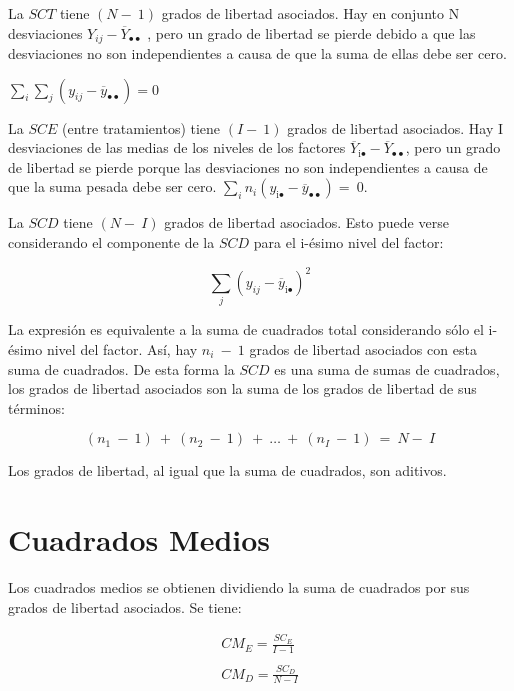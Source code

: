 \documentclass[]{book}
\theoremstyle{definition}
\theoremstyle{definition}
\theoremstyle{definition}
\theoremstyle{remark}
\begin{document}
La \(SCT\) tiene \((N -\ 1)\) grados de libertad asociados. Hay en
conjunto N desviaciones \(Y_{ij} - {\overline{Y}}_{\bullet\bullet}\) ,
pero un grado de libertad se pierde debido a que las desviaciones no son
independientes a causa de que la suma de ellas debe ser cero.

\(\sum_{i}^{}{\sum_{j}^{}\left(y_{ij} - {\overline{y}}_{\bullet\bullet} \right)} = 0\)

La \(SCE\) (entre tratamientos) tiene \((I -\ 1)\) grados de libertad
asociados. Hay I desviaciones de las medias de los niveles de los
factores
\({\overline{Y}}_{\text{i}\bullet} - {\overline{Y}}_{\bullet\bullet}\),
pero un grado de libertad se pierde porque las desviaciones no son
independientes a causa de que la suma pesada debe ser cero.
\(\sum_{i}^{}{n_{i}\left( y_{\text{i}\bullet} - {\overline{y}}_{\bullet\bullet} \right) = \ 0}\).

La \(SCD\) tiene \((N -\ I)\) grados de libertad asociados. Esto puede
verse considerando el componente de la \(SCD\) para el i-ésimo nivel del
factor:

\[
\sum_{j}^{}\left( y_{ij} - {\overline{y}}_{\text{i}\bullet} \right)^{2}
\]

La expresión es equivalente a la suma de cuadrados total considerando
sólo el i-ésimo nivel del factor. Así, hay \(n_{i}\  - \ 1\) grados de
libertad asociados con esta suma de cuadrados. De esta forma la \(SCD\)
es una suma de sumas de cuadrados, los grados de libertad asociados son
la suma de los grados de libertad de sus términos:

\[
(n_{1}\  - \ 1)\  + \ (n_{2}\  - \ 1)\  + \ \ldots\  + \ (n_{I}\  - \ 1)\  = \ N-\ I
\]

Los grados de libertad, al igual que la suma de cuadrados, son aditivos.

\hypertarget{cuadrados-medios}{%
\section{Cuadrados Medios}\label{cuadrados-medios}}

Los cuadrados medios se obtienen dividiendo la suma de cuadrados por sus
grados de libertad asociados. Se tiene:

\[
\begin{matrix}
CM_E = \frac{SC_E}{I - 1} \\
 \\
CM_D = \frac{SC_D}{N - I} \\
\end{matrix}
\]
\end{document}
